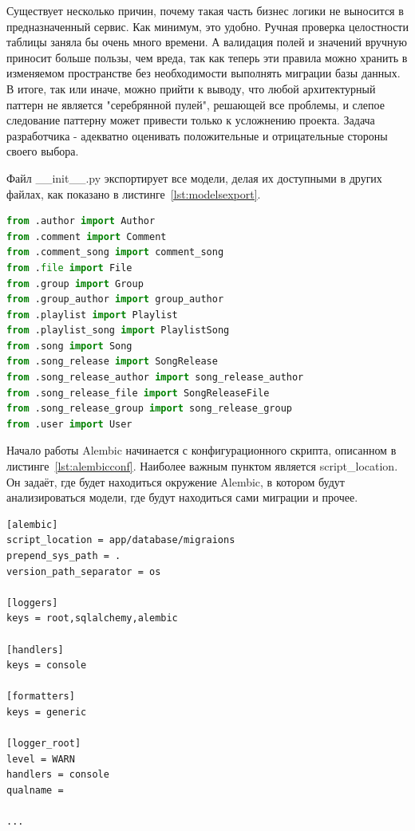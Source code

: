 \documentclass[14pt]{extarticle}
\begin{document}
Существует несколько причин, почему такая часть бизнес логики не выносится в предназначенный сервис. 
Как минимум, это удобно. Ручная проверка целостности таблицы заняла бы очень много времени. А валидация полей и значений вручную приносит больше
пользы, чем вреда, так как теперь эти правила можно хранить в изменяемом пространстве без необходимости выполнять миграции базы данных. 
В итоге, так или иначе, можно прийти к выводу, что любой архитектурный паттерн не является "серебрянной пулей", решающей все проблемы, и
слепое следование паттерну может привести только к усложнению проекта. Задача разработчика - адекватно оценивать положительные и отрицательные
стороны своего выбора.

Файл \_\_init\_\_.py экспортирует все модели, делая их доступными в других файлах, как показано в листинге~\ref{lst:modelsexport}. 

\begin{lstlisting}[caption={Экспорт моделей}, label={lst:modelsexport}, language=Python]
from .author import Author
from .comment import Comment
from .comment_song import comment_song
from .file import File
from .group import Group
from .group_author import group_author
from .playlist import Playlist
from .playlist_song import PlaylistSong
from .song import Song
from .song_release import SongRelease
from .song_release_author import song_release_author
from .song_release_file import SongReleaseFile
from .song_release_group import song_release_group
from .user import User
\end{lstlisting}

Начало работы Alembic начинается с конфигурационного скрипта, описанном в листинге~\ref{lst:alembicconf}. 
Наиболее важным пунктом является script\_location. Он задаёт, где будет находиться окружение Alembic, в котором
будут анализироваться модели, где будут находиться сами миграции и прочее. 

\begin{lstlisting}[caption={Конфигурация Alembic}, label={lst:alembicconf}]
[alembic]
script_location = app/database/migraions
prepend_sys_path = .
version_path_separator = os

[loggers]
keys = root,sqlalchemy,alembic

[handlers]
keys = console

[formatters]
keys = generic

[logger_root]
level = WARN
handlers = console
qualname =

...
\end{lstlisting}
\end{document}
